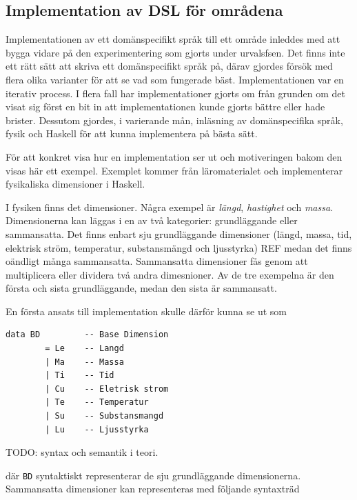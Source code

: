 \begin{draft}

\subsection{Implementation av DSL för områdena}

Implementationen av ett domänspecifikt språk till ett område inleddes med att bygga vidare på den experimentering som gjorts under urvalsfsen. Det finns inte ett rätt sätt att skriva ett domänspecifikt språk på, därav gjordes försök med flera olika varianter för att se vad som fungerade bäst. Implementationen var en iterativ process. I flera fall har implementationer gjorts om från grunden om det visat sig först en bit in att implementationen kunde gjorts bättre eller hade brister. Dessutom gjordes, i varierande mån, inläsning av domänspecifika språk, fysik och Haskell för att kunna implementera på bästa sätt.

För att konkret visa hur en implementation ser ut och motiveringen bakom den visas här ett exempel. Exemplet kommer från läromaterialet och implementerar fysikaliska dimensioner i Haskell.

I fysiken finns det dimensioner. Några exempel är \textit{längd}, \textit{hastighet} och \textit{massa}. Dimensionerna kan läggas i en av två kategorier: grundläggande eller sammansatta. Det finns enbart sju grundläggande dimensioner (längd, massa, tid, elektrisk ström, temperatur, substansmängd och ljusstyrka) REF medan det finns oändligt många sammansatta. Sammansatta dimensioner fås genom att multiplicera eller dividera två andra dimesnioner. Av de tre exempelna är den första och sista grundläggande, medan den sista är sammansatt.

En första ansats till implementation skulle därför kunna se ut som

\begin{lstlisting}[frame=none, belowskip=-0.5\baselineskip, xleftmargin=0.5in]
 data BD         -- Base Dimension
        = Le    -- Langd
        | Ma    -- Massa
        | Ti    -- Tid
        | Cu    -- Eletrisk strom
        | Te    -- Temperatur
        | Su    -- Substansmangd
        | Lu    -- Ljusstyrka
\end{lstlisting}

TODO: syntax och semantik i teori.

där \texttt{BD} syntaktiskt representerar de sju grundläggande dimensionerna. Sammansatta dimensioner kan representeras med följande syntaxträd


\end{draft}
